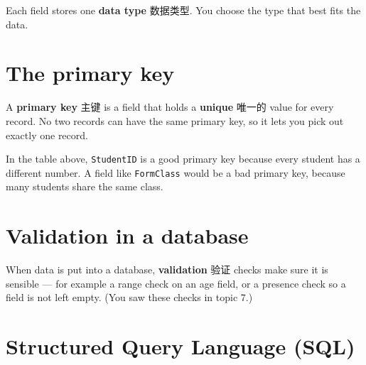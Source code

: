 \documentclass[11pt]{article}
\begin{document}
Each field stores one \textbf{data type} 数据类型. You choose the type that best fits the data.

\begin{center}
\end{center}

\section*{The primary key}

A \textbf{primary key} 主键 is a field that holds a \textbf{unique} 唯一的 value for every record. No two records can have the same primary key, so it lets you pick out exactly one record.

In the table above, \texttt{StudentID} is a good primary key because every student has a different number. A field like \texttt{FormClass} would be a bad primary key, because many students share the same class.

\section*{Validation in a database}

When data is put into a database, \textbf{validation} 验证 checks make sure it is sensible — for example a range check on an age field, or a presence check so a field is not left empty. (You saw these checks in topic 7.)

\section*{Structured Query Language (SQL)}
\end{document}
